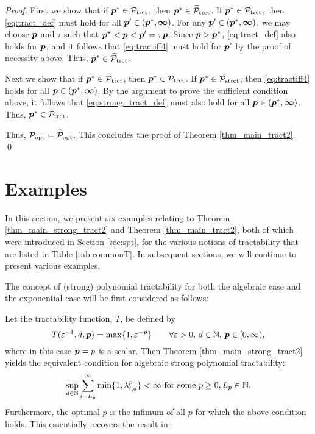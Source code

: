 \documentclass[sort&compress]{elsarticle}
\newcommand{\vinfty}{\boldsymbol{\infty}}
\begin{document}
\begin{proof}
First we show  that if $\boldsymbol{p}^* \in \mathcal{P}_{\textup{trct}}$, then $\boldsymbol{p}^* \in \widetilde{\mathcal{P}}_{\textup{trct}}$.  If $\boldsymbol{p}^* \in \mathcal{P}_{\textup{trct}}$, then \eqref{eq:tract_def} must hold for all $\vp' \in (\vp^*,\vinfty)$.  For any $\vp' \in (\vp^*,\vinfty)$, we may choose $\boldsymbol{p}$ and $\tau$ such that $\boldsymbol{p}^* < \boldsymbol{p} < \boldsymbol{p}' = \tau \boldsymbol{p}$. Since $\boldsymbol{p} > \boldsymbol{p}^*$, \eqref{eq:tract_def} also holds for $\boldsymbol{p}$, and it follows that \eqref{eq:tractiff4} must hold for $\boldsymbol{p}'$ by the proof of necessity above.  Thus, $\boldsymbol{p}^* \in \widetilde{\mathcal{P}}_{\textup{trct}}$.

Next we show that if $\boldsymbol{p}^* \in \widetilde{\mathcal{P}}_{\textup{trct}}$, then $\boldsymbol{p}^* \in \mathcal{P}_{\textup{trct}}$.  If $\boldsymbol{p}^* \in \widetilde{\mathcal{P}}_{\textup{strct}}$, then \eqref{eq:tractiff4}  holds for all $\vp \in (\vp^*,\vinfty)$.  By the argument to prove the sufficient condition above, it follows that \eqref{eq:strong_tract_def} must also hold for all $\vp \in (\vp^*,\vinfty)$. Thus, $\boldsymbol{p}^* \in \mathcal{P}_{\textup{trct}}$.


Thus,  $\mathcal{P}_{\textup{opt}}= \widetilde{\mathcal{P}}_{\textup{opt}}$.  This concludes the proof of Theorem \ref{thm_main_tract2}.  \qed
\end{proof}


\section{Examples} \label{sec:examples}
In this section, we present six examples relating to Theorem \ref{thm_main_strong_tract2} and Theorem \ref{thm_main_tract2}, both of which were introduced in Section \ref{sec:spt}, for the various notions of tractability that are listed in Table \ref{tab:commonT}. In subsequent sections, we will continue to present various examples.



The concept of (strong) polynomial tractability for both the algebraic case and the exponential case will be first considered as follows:

\begin{example}

Let the tractability function, $T$,
be defined by
\[
 T(\varepsilon^{-1},d,\boldsymbol{p})= \max\{1,\varepsilon^{-\boldsymbol{p}}\}
 \qquad \forall \varepsilon > 0, \,  d \in \mathbb{N}, \, \boldsymbol{p} \in [0,\infty),
\]
where in this case $\boldsymbol{p}=p$ is a scalar.
Then Theorem \ref{thm_main_strong_tract2} yields the  equivalent condition for algebraic strong polynomial tractability:
\[
 \sup_{d\in\mathbb{N}} \sum_{i=L_p}^\infty \min\{1,\lambda_{i,d}^p\} < \infty \text{ for some } p \ge 0, L_p \in \mathbb{N}.
\]
Furthermore, the optimal $p$ is the infimum of all $p$ for which the above condition holds.
This essentially recovers the result in \cite[Theorem 5.1]{NovWoz08a}.
\end{example}
\end{document}
